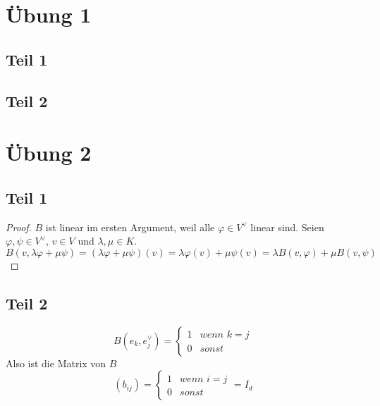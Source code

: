 \documentclass[10pt,a4paper]{article}
\begin{document}
\section*{Übung 1}

\subsection*{Teil 1}



\subsection*{Teil 2}

\section*{Übung 2}

\subsection*{Teil 1}

\begin{proof}
$B$ ist linear im ersten Argument, weil alle $\varphi \in V^{\vee}$ linear sind.
Seien $\varphi, \psi \in V^{\vee}$, $v \in V$ und $\lambda, \mu \in K$.
\begin{equation}
B(v, \lambda \varphi + \mu \psi) = (\lambda \varphi + \mu \psi)(v) = \lambda \varphi(v) + \mu \psi(v) = \lambda B(v, \varphi) + \mu B(v, \psi)
\end{equation}
\end{proof}

\subsection*{Teil 2}

\begin{equation}
B(e_{k}, e_{j}^{\vee}) = \begin{cases}
1 & \textit{wenn $k = j$}\\
0 & \textit{sonst}
\end{cases}
\end{equation}
Also ist die Matrix von $B$
\begin{equation}
(b_{ij}) = \begin{cases}
1 & \textit{wenn $i = j$}\\
0 & \textit{sonst}
\end{cases}
= I_{d}
\end{equation}
\end{document}
